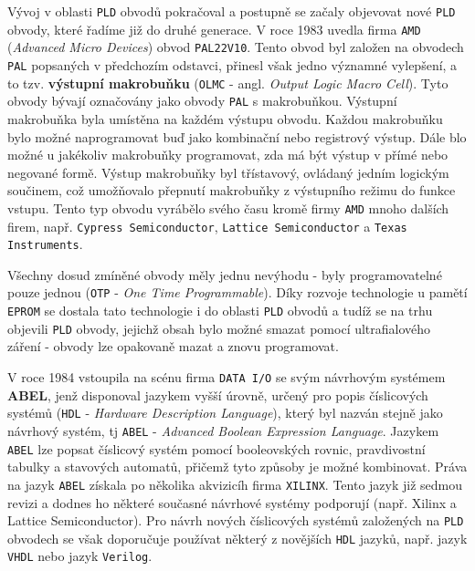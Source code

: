       Vývoj v oblasti \texttt{PLD} obvodů pokračoval a postupně se začaly objevovat nové
      \texttt{PLD} obvody, které řadíme již do druhé generace. V roce 1983 uvedla firma
      \texttt{AMD} (\emph{Advanced Micro Devices}) obvod \texttt{PAL22V10}. Tento obvod byl založen
      na obvodech \texttt{PAL} popsaných v předchozím odstavci, přinesl však jedno významné
      vylepšení, a to tzv. \textbf{výstupní makrobuňku} (\texttt{OLMC} - angl. \emph{Output Logic
      Macro Cell}). Tyto obvody bývají označovány jako obvody \texttt{PAL} s makrobuňkou. Výstupní
      makrobuňka byla umístěna na každém výstupu obvodu. Každou makrobuňku bylo možné naprogramovat
      buď jako kombinační nebo registrový výstup. Dále blo možné u jakékoliv makrobuňky
      programovat, zda má být výstup v přímé nebo negované formě. Výstup makrobuňky byl třístavový,
      ovládaný jedním logickým součinem, což umož\-ňo\-va\-lo přepnutí makrobuňky z výstupního
      režimu do funkce vstupu. Tento typ obvodu vyrábělo svého času kromě firmy \texttt{AMD} mnoho
      dalších firem, např. \texttt{Cypress Semiconductor}, \texttt{Lattice Semiconductor} a
      \texttt{Texas Instruments}.
      
      Všechny dosud zmíněné obvody měly jednu nevýhodu - byly programovatelné pou\-ze jednou
      (\texttt{OTP} - \emph{One Time Programmable}). Díky rozvoje technologie u pamětí
      \texttt{EPROM} se dostala tato technologie i do oblasti \texttt{PLD} obvodů a tudíž se na
      trhu objevili \texttt{PLD} obvody, jejichž obsah bylo možné smazat pomocí ultrafialového
      záření - obvody lze opakovaně mazat a znovu programovat.
      
      V roce 1984 vstoupila na scénu firma \texttt{DATA I/O} se svým návrhovým systémem
      \textbf{ABEL}, jenž disponoval jazykem vyšší úrovně, určený pro popis číslicových systémů
      (\texttt{HDL} - \emph{Hardware Description Language}), který byl nazván stejně jako návrhový
      systém, tj \texttt{ABEL} - \emph{Advanced Boolean Expression Language}. Jazykem \texttt{ABEL}
      lze popsat číslicový systém pomocí booleovských rovnic, pravdivostní tabulky a stavových
      automatů, přičemž tyto způsoby je možné kombinovat. Práva na jazyk \texttt{ABEL} získala po
      několika akvizicíh firma \texttt{XILINX}. Tento jazyk již sedmou revizi a dodnes ho některé
      současné návrhové systémy podporují (např. Xilinx a Lattice Semiconductor). Pro návrh nových
      číslicových systémů založených na \texttt{PLD} obvodech se však doporučuje používat některý z
      novějších \texttt{HDL} jazyků, např. jazyk \texttt{VHDL} nebo jazyk \texttt{Verilog}.
      
